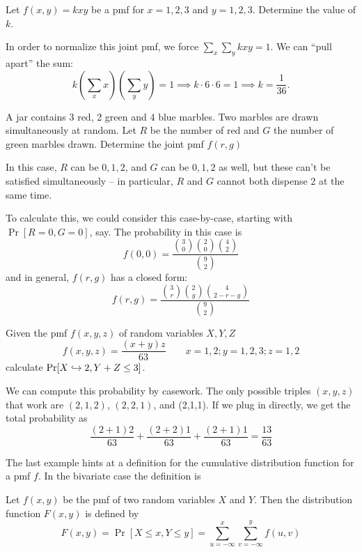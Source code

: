\documentclass[../main.tex]{subfiles}
\begin{document}
\begin{example}
Let $f(x,y) = kxy$ be a pmf for $x=1,2,3$ and $y=1,2,3$. Determine the value of $k$.
\end{example}
\begin{solution}
In order to normalize this joint pmf, we force $\displaystyle\sum_x \displaystyle\sum_y kxy = 1$. We can ``pull apart'' the sum: 
\[
    k \left( \sum_x x\right) \left( \sum_y y \right) = 1 \implies k \cdot 6 \cdot 6 = 1 \implies k = \frac{1}{36}.
\]
\end{solution}
\begin{example}
A jar contains 3 red, 2 green and 4 blue marbles. Two marbles are drawn simultaneously at random. Let $R$ be the number of red and $G$ the number
of green marbles drawn. Determine the joint pmf $f(r,g)$
\label{ex:jar}
\end{example}
\begin{solution}
In this case, $R$ can be $0, 1, 2$, and $G$ can be $0, 1, 2$ as well, but these can't be satisfied simultaneously -- in particular, $R$ and $G$ cannot both dispense 2 at the same time. 

To calculate this, we could consider this case-by-case, starting with $\Pr[R=0, G=0]$, say. The probability in this case is 
\[
    f(0,0) = \frac{\binom{3}{0} \binom{2}{0} \binom{4}{2}}{\binom{9}{2}}
\]
and in general, $f(r, g)$ has a closed form: 
\[
    f(r,g) = \frac{\binom{3}{r} \binom{2}{g} \binom{4}{2-r-g}}{\binom{9}{2}}
\]
\end{solution}
\begin{example}
Given the pmf $f(x,y,z)$ of random variables $X,Y,Z$
$$f(x,y,z) = \frac{(x+y)z}{63}\qquad x=1,2; y=1,2,3; z=1,2$$
calculate $\mathrm{Pr}[X \hookrightarrow 2, Y+Z \leq 3]$.
\end{example}
\begin{solution}
We can compute this probability by casework. The only possible triples $(x,y,z)$ that work are $(2,1,2)$, $(2,2,1)$, and (2,1,1). If we plug in directly, we get the total probability as 
\[
    \frac{(2+1)2}{63} + \frac{(2+2)1}{63} + \frac{(2+1)1}{63}  = \frac{13}{63}
\]
\end{solution}
The last example hints at a definition for the cumulative
distribution function for a pmf $f$. In the bivariate case the definition is
\begin{definition}
Let $f(x,y)$ be the pmf of two random variables $X$ and $Y$. Then the distribution function $F(x,y)$ is defined by
$$F(x,y) = \Pr[X \leq x, Y \leq y] = \sum_{u=-\infty}^x \sum_{v=-\infty}^y f(u,v)$$
\end{definition}
\end{document}
